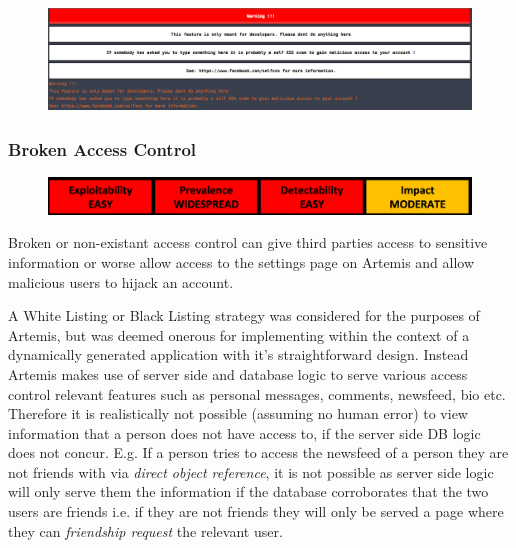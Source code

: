     \begin{figure}[h]
    	\centering
    	\includegraphics[scale=0.44,right]{chapters/chapter03/figures/ArtemisXSS.png}
    	\label{ArtemisSelfXSS}
    \end{figure}   
    
    
    
    \newpage

    \subsubsection{Broken Access Control}
    
    \begin{figure}[h]
    	\centering
    	\includegraphics[scale=0.5,center]{chapters/chapter03/figures/brokenAccess.png}
    	\label{Broken Access Control}
    \end{figure}
    
    Broken or non-existant access control can give third parties access to sensitive information or worse allow access to the settings page on Artemis and allow malicious users to hijack an account.
    
    A White Listing or Black Listing strategy was considered for the purposes of Artemis, but was deemed onerous for implementing within the context of a dynamically generated application with it's straightforward design. Instead Artemis makes use of server side and database logic to serve various access control relevant features such as personal messages, comments, newsfeed, bio etc. Therefore it is realistically not possible (assuming no human error) to view information that a person does not have access to, if the server side DB logic does not concur. E.g. If a person tries to access the newsfeed of a person they are not friends with via \textit{direct object reference}, it is not possible as server side logic will only serve them the information if the database corroborates that the two users are friends i.e. if they are not friends they will only be served a page where they can \textit{friendship request} the relevant user.
    
